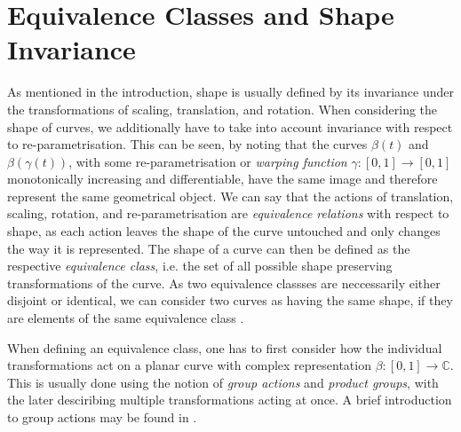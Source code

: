 \section{Equivalence Classes and Shape Invariance}
\label{theo:inv}
As mentioned in the introduction, shape is usually defined by its invariance under the transformations of scaling, translation, and rotation.
When considering the shape of curves, we additionally have to take into account invariance with respect to re-parametrisation.
This can be seen, by noting that the curves $\beta(t)$ and $\beta(\gamma(t))$, with some re-parametrisation or \textit{warping function} $\gamma : [0,1] \rightarrow [0,1]$ monotonically increasing and differentiable, have the same image and therefore represent the same geometrical object.
We can say that the actions of translation, scaling, rotation, and re-parametrisation are \textit{equivalence relations} with respect to shape, as each action leaves the shape of the curve untouched and only changes the way it is represented.
The shape of a curve can then be defined as the respective \textit{equivalence class}, i.e. the set of all possible shape preserving transformations of the curve.
As two equivalence classses are neccessarily either disjoint or identical, we can consider two curves as having the same shape, if they are elements of the same equivalence class \parencite[see][40]{SrivastavaKlassen2016}.

When defining an equivalence class, one has to first consider how the individual transformations act on a planar curve with complex representation $\beta : [0,1] \rightarrow \mathbb{C}$.
This is usually done using the notion of \textit{group actions} and \textit{product groups}, with the later desciribing multiple transformations acting at once.
A brief introduction to group actions may be found in \cite[Chap.\ 3]{SrivastavaKlassen2016}.

